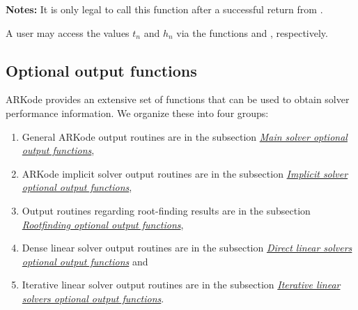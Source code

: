 \documentclass[letterpaper,10pt,english]{sphinxmanual}
\begin{document}
\begin{fulllineitems}
\begin{description}
\begin{itemize}
\end{itemize}

\end{description}

\textbf{Notes:} It is only legal to call this function after a successful
return from {\hyperref[c_interface/User_callable:ARKode]{}}.

A user may access the values $t_n$ and $h_n$ via the
functions {\hyperref[c_interface/User_callable:ARKodeGetCurrentTime]{}} and
{\hyperref[c_interface/User_callable:ARKodeGetLastStep]{}}, respectively.

\end{fulllineitems}



\subsection{Optional output functions}
\label{c_interface/User_callable:optional-output-functions}\label{c_interface/User_callable:cinterface-optionaloutputs}
ARKode provides an extensive set of functions that can be used to
obtain solver performance information.  We organize these into four
groups:
\begin{enumerate}
\item {} 
General ARKode output routines are in the subsection
{\hyperref[c_interface/User_callable:cinterface-arkodemainoutputs]{\emph{Main solver optional output functions}}},

\item {} 
ARKode implicit solver output routines are in the subsection
{\hyperref[c_interface/User_callable:cinterface-arkodeimplicitsolveroutputs]{\emph{Implicit solver optional output functions}}},

\item {} 
Output routines regarding root-finding results are in the subsection
{\hyperref[c_interface/User_callable:cinterface-arkoderootoutputs]{\emph{Rootfinding optional output functions}}},

\item {} 
Dense linear solver output routines are in the subsection
{\hyperref[c_interface/User_callable:cinterface-arkdlsoutputs]{\emph{Direct linear solvers optional output functions}}} and

\item {} 
Iterative linear solver output routines are in the subsection
{\hyperref[c_interface/User_callable:cinterface-arkspilsoutputs]{\emph{Iterative linear solvers optional output functions}}}.

\end{enumerate}
\end{document}
